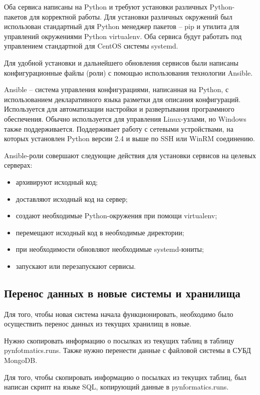 Оба сервиса написаны на Python и требуют установки различных Python-пакетов для корректной работы.
Для установки различных окружений был использован стандартный для Python менеджер пакетов -- pip и утилита для управлений окружениями Python virtualenv. Оба сервиса будут работать под управлением стандартной для CentOS системы systemd.

Для удобной установки и дальнейшего обновления сервисов были написаны конфигурационные файлы (роли) с помощью использования технологии Ansible.

Ansible -- система управления конфигурациями, написанная на Python, с использованием декларативного языка разметки для описания конфигураций.
Используется для автоматизации настройки и развертывания программного обеспечения. 
Обычно используется для управления Linux-узлами, но Windows также поддерживается. 
Поддерживает работу с сетевыми устройствами, на которых установлен Python версии 2.4 и выше по SSH или WinRM соединению.

Ansible-роли совершают следующие действия для установки сервисов на целевых серверах:

\begin{itemize}
    \item архивируют исходный код;
    \item доставляют исходный код на сервер;
    \item создают необходимые Python-окружения при помощи virtualenv;
    \item перемещают исходный код в необходимые директории;
    \item при необходимости обновляют необходимые systemd-юниты;
    \item запускают или перезапускают сервисы.
\end{itemize}

\subsection{Перенос данных в новые системы и хранилища}

\label{chap:move_data}
Для того, чтобы новая система начала функционировать,
необходимо было осуществить перенос данных из текущих хранилищ в новые.

Нужно скопировать информацию о посылках из текущих таблиц в таблицу pynfotmatics.runs. 
Также нужно перенести данные с файловой системы в СУБД MongoDB.

Для того, чтобы скопировать информацию о посылках из текущих таблиц, 
был написан скрипт на языке SQL, копирующий данные в pynformatics.runs.

